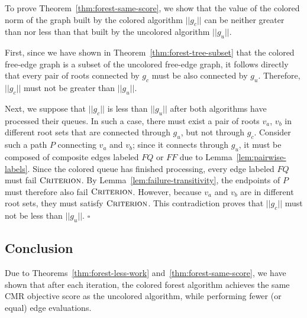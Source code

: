 \documentclass{report}
\newenvironment{proof}[1][Proof]{\begin{trivlist}
   \item[\hskip \labelsep {\bfseries #1}]}{\hfill$\square$\end{trivlist}}
\begin{document}
\begin{proof}
To prove Theorem~\ref{thm:forest-same-score},
we show that the value of the colored norm of the graph built by the
colored algorithm $||g_c||$
can be neither greater than nor less than
that built by the uncolored algorithm $||g_u||$.

First, since we have shown in Theorem~\ref{thm:forest-tree-subset}
that the colored free-edge graph is a subset of the uncolored free-edge
graph,
it follows directly that every pair of roots connected by $g_c$
must be also connected by $g_u$.
Therefore, $||g_c||$ must not be greater than $||g_u||$.

Next, we suppose that $||g_c||$ is less than $||g_u||$
after both algorithms have processed their queues.
In such a case,
there must exist a pair of roots $v_a$, $v_b$ in different root sets
that are connected through $g_u$,
but not through $g_c$.
Consider such a path $P$ connecting $v_a$ and $v_b$;
since it connects through $g_u$,
it must be composed of composite edges labeled $FQ$ or $FF$
due to Lemma~\ref{lem:pairwise-labels}.
Since the colored queue has finished processing,
every edge labeled $FQ$ must fail $\textsc{Criterion}$.
By Lemma~\ref{lem:failure-transitivity},
the endpoints of $P$ must therefore also fail $\textsc{Criterion}$.
However, because $v_a$ and $v_b$ are in different root sets,
they must satisfy $\textsc{Criterion}$.
This contradiction proves that
$||g_c||$ must not be less than $||g_u||$.
\end{proof}


\subsection{Conclusion}

Due to Theorems~\ref{thm:forest-less-work}
and~\ref{thm:forest-same-score},
we have shown that after each iteration,
the colored forest algorithm achieves the same CMR objective score
as the uncolored algorithm,
while performing fewer (or equal) edge evaluations.

%
%
\end{document}
